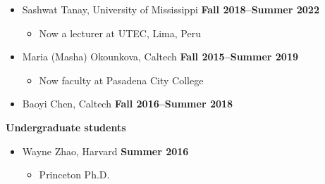\documentclass[margin,line]{res}
\begin{document}
\begin{resume}
\begin{itemize}
\hfill {\bf Fall 2018--Summer 2024}
\item[] Sashwat Tanay, University of Mississippi
\hfill {\bf Fall 2018--Summer 2022}
\begin{itemize}
\vspace{-.05in}
\item[] Now a lecturer at UTEC, Lima, Peru
\vspace{-.05in}
\end{itemize}
\item[] Maria (Masha) Okounkova, Caltech
\hfill {\bf Fall 2015--Summer 2019}
\begin{itemize}
\vspace{-.05in}
\item[] Now faculty at Pasadena City College
\end{itemize}
\item[] Baoyi Chen, Caltech
\hfill {\bf Fall 2016--Summer 2018}
\end{itemize}

%

{\bf Undergraduate students}
\begin{itemize}
\item[] Wayne Zhao, Harvard
\hfill {\bf Summer 2016}
\begin{itemize}
\vspace{-.05in}
\item[] Princeton Ph.D.
\end{itemize}
\end{itemize}


\end{resume}
\end{document}
